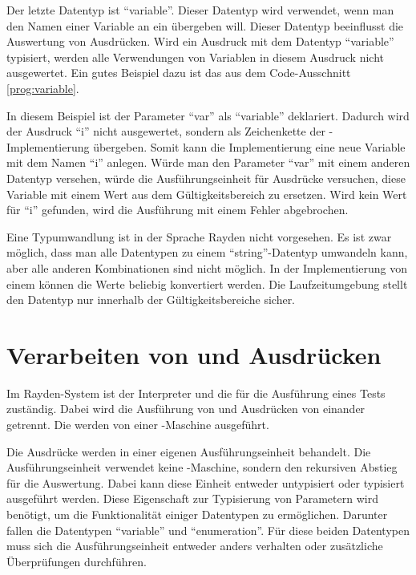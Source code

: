 \SuperPar
Der letzte Datentyp ist "`variable"'. Dieser Datentyp wird verwendet, wenn man den Namen einer Variable an ein  übergeben will. Dieser Datentyp beeinflusst die Auswertung von Ausdrücken. Wird ein Ausdruck mit dem Datentyp "`variable"' typisiert, werden alle Verwendungen von Variablen in diesem Ausdruck nicht ausgewertet. Ein gutes Beispiel dazu ist das  aus dem Code-Ausschnitt \ref{prog:variable}.

\SuperPar
In diesem Beispiel ist der Parameter "`var"' als "`variable"' deklariert. Dadurch wird der Ausdruck "`i"' nicht ausgewertet, sondern als Zeichenkette der -Implementierung übergeben. Somit kann die Implementierung eine neue Variable mit dem Namen "`i"' anlegen. Würde man den Parameter "`var"' mit einem anderen Datentyp versehen, würde die Ausführungseinheit für Ausdrücke versuchen, diese Variable mit einem Wert aus dem Gültigkeitsbereich zu ersetzen. Wird kein Wert für "`i"' gefunden, wird die Ausführung mit einem Fehler abgebrochen.

\SuperPar
Eine Typumwandlung ist in der Sprache Rayden nicht vorgesehen. Es ist zwar möglich, dass man alle Datentypen zu einem "`string"'-Datentyp umwandeln kann, aber alle anderen Kombinationen sind nicht möglich. In der Implementierung von einem  können die Werte beliebig konvertiert werden. Die Laufzeitumgebung stellt den Datentyp nur innerhalb der Gültigkeitsbereiche sicher.

\section{Verarbeiten von  und Ausdrücken}

Im Rayden-System ist der Interpreter und die  für die Ausführung eines Tests zuständig. Dabei wird die Ausführung von  und Ausdrücken von einander getrennt. Die  werden von einer -Maschine ausgeführt. 

\SuperPar
Die Ausdrücke werden in einer eigenen Ausführungseinheit behandelt. Die Ausführungseinheit verwendet keine -Maschine, sondern den rekursiven Abstieg für die Auswertung. Dabei kann diese Einheit entweder untypisiert oder typisiert ausgeführt werden. Diese Eigenschaft zur Typisierung von Parametern wird benötigt, um die Funktionalität einiger Datentypen zu ermöglichen. Darunter fallen die Datentypen "`variable"' und "`enumeration"'. Für diese beiden Datentypen muss sich die Ausführungseinheit entweder anders verhalten oder zusätzliche Überprüfungen durchführen. 

